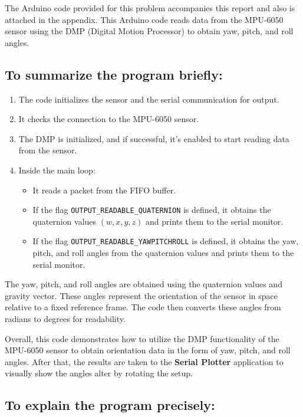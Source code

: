 \documentclass[conference]{IEEEtran}
\let\oldtexttt\texttt
\renewcommand{\texttt}[1]{\small\oldtexttt{#1}}
\begin{document}
The Arduino code provided for this problem accompanies this report and also is attached in the appendix. This Arduino code reads data from the MPU-6050 sensor using the DMP (Digital Motion Processor) to obtain yaw, pitch, and roll angles.\cite{b4} \\

\subsection{To summarize the program briefly:}
\begin{enumerate}
    \item The code initializes the sensor and the serial communication for output.
    \item It checks the connection to the MPU-6050 sensor.
    \item The DMP is initialized, and if successful, it's enabled to start reading data from the sensor.
    \item Inside the main loop:
          \begin{itemize}
              \item It reads a packet from the FIFO buffer.
              \item If the flag {\texttt{OUTPUT\_READABLE\_QUATERNION}} is defined, it obtains the quaternion values $(w, x, y, z)$ and prints them to the serial monitor.
              \item If the flag {\texttt{OUTPUT\_READABLE\_YAWPITCHROLL}} is defined, it obtains the yaw, pitch, and roll angles from the quaternion values and prints them to the serial monitor.
          \end{itemize}
\end{enumerate}

The yaw, pitch, and roll angles are obtained using the quaternion values and gravity vector. These angles represent the orientation of the sensor in space relative to a fixed reference frame. The code then converts these angles from radians to degrees for readability.

Overall, this code demonstrates how to utilize the DMP functionality of the MPU-6050 sensor to obtain orientation data in the form of yaw, pitch, and roll angles. After that, the results are taken to the \textbf{Serial Plotter} application\cite{b6} to visually show the angles alter by rotating the setup.


\subsection{To explain the program precisely:}
\end{document}
